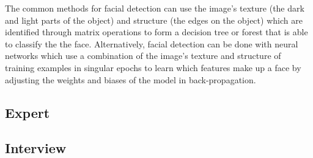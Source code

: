 The common methods for facial detection can use the image's texture (the dark and light parts of the object) and structure (the edges on the object) which are identified through matrix operations to form a decision tree or forest that is able to classify the the face. Alternatively, facial detection can be done with neural networks which use a combination of the image's texture and structure of training examples in singular epochs to learn which features make up a face by adjusting the weights and biases of the model in back-propagation.
\par
{}


\subsection{Expert}



\subsection{Interview}

